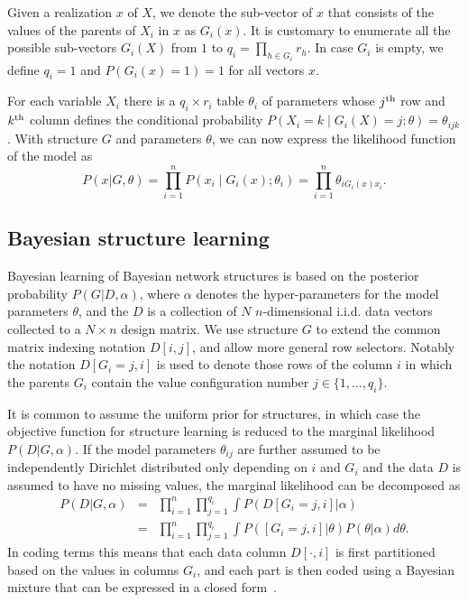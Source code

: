 \documentclass[letterpaper]{article}
\begin{document}
Given a realization $x$ of $X$, we denote the sub\nobreakdash-vector
of $x$ that consists of the values of the parents of $X_{i}$ in $x$ as
$G_{i}(x)$. It is customary to enumerate all the possible
sub\nobreakdash-vectors $G_{i}(X)$ from $1$ to $q_{i}=\prod_{h\in
  G_{i}}r_{h}.$ In case $G_{i}$ is empty, we define $q_{i}=1$ and
$P(G_{i}(x)=1)=1$ for all vectors $x$.

For each variable $X_{i}$ there is a $q_{i}\times r_{i}$ table
$\theta_{i}$ of parameters whose $j^{\textnormal{th}}$ row and
$k^{\textnormal{th}}$ column defines the conditional probability
$P(X_{i}=k\mid G_{i}(X)=j;\theta)=\theta_{ijk}$.  With structure $G$
and parameters $\theta$, we can now express the likelihood function of
the model as
\begin{equation}
P(x|G,\theta)=\prod_{i=1}^{n}P(x_{i}\mid G_{i}(x);\theta_{i})=\prod_{i=1}^{n}\theta_{iG_{i}(x)x_{i}}.
\end{equation}



\subsection{Bayesian structure learning}

Bayesian learning of Bayesian network structures is based on the
posterior probability $P(G|D,\alpha)$, where $\alpha$ denotes the
hyper\nobreakdash-parameters for the model parameters $\theta$, and
the $D$ is a collection of $N$ $n$\nobreakdash-dimensional i.i.d. data
vectors collected to a $N\times n$ design matrix.  We use structure
$G$ to extend the common matrix indexing notation $D[i,j]$, and allow
more general row selectors.  Notably the notation $D[G_i=j,i]$ is used
to denote those rows of the column $i$ in which the parents $G_i$
contain the value configuration number $j\in\{1,\ldots,q_i\}$.

It is common to assume the uniform prior for structures, in which case
the objective function for structure learning is reduced to the
marginal likelihood $P(D|G,\alpha)$.  If the model parameters
$\theta_{ij}$ are further assumed to be independently Dirichlet
distributed only depending on $i$ and $G_{i}$ and the data $D$ is
assumed to have no missing values, the marginal likelihood can be
decomposed as
\begin{eqnarray}
\label{eqn:bayesmix}
P(D|G,\alpha) & = & \prod_{i=1}^{n}\prod_{j=1}^{q_i}\int
P(D[G_i=j,i]|\alpha)\\ & = & \prod_{i=1}^{n}\prod_{j=1}^{q_i}\int
P([G_i=j,i]|\theta)P(\theta|\alpha) d\theta.\nonumber
\end{eqnarray}
In coding terms this means that each data column $D[\cdot,i]$ is first partitioned based on the
values in columns $G_i$, and each part is then coded using a Bayesian mixture that can be expressed
in a closed form~\cite{Bunt91, Heck95}.
\end{document}
